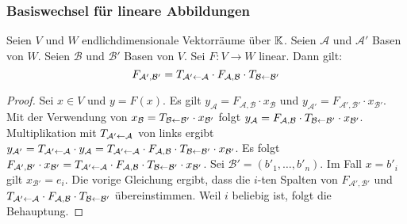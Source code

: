 \subsubsection{Basiswechsel für lineare Abbildungen}

\begin{thm}
	Seien $ V $ und $ W $ endlichdimensionale Vektorräume über $ \mathbb K $. Seien $ \mathcal{A} $ und $ \mathcal{A'} $ Basen von $ W $. Seien $ \mathcal{B} $ und $ \mathcal{B'} $ Basen von $ V $. Sei $ F : V \to W $ linear. Dann gilt:
	\begin{equation}
		F_\mathcal{A',B'} = T_{\mathcal{A'} \leftarrow \mathcal{A}} \cdot F_\mathcal{A,B} \cdot T_{\mathcal{B} \leftarrow \mathcal{B'}}
	\end{equation}
\end{thm}
\begin{proof} 
	Sei $ x \in V $ und $ y = F(x) $. Es gilt $ y_\mathcal{A} = F_\mathcal{A,B} \cdot x_\mathcal{B} $ und $ y_\mathcal{A'} = F_\mathcal{A',B'} \cdot x_\mathcal{B'} $. Mit der Verwendung von $ x_\mathcal{B} = T_{\mathcal{B} \leftarrow \mathcal{B'}} \cdot x_\mathcal{B'} $ folgt $ y_\mathcal{A} = F_\mathcal{A,B} \cdot T_{\mathcal{B} \leftarrow \mathcal{B'}} \cdot x_\mathcal{B'} $. Multiplikation mit $ T_{\mathcal{A'} \leftarrow \mathcal{A}} $ von links ergibt $ y_\mathcal{A'} =  T_{\mathcal{A'} \leftarrow \mathcal{A}} \cdot y_\mathcal{A} = T_{\mathcal{A'} \leftarrow \mathcal{A}} \cdot F_\mathcal{A,B} \cdot T_{\mathcal{B} \leftarrow \mathcal{B'}} \cdot x_\mathcal{B'} $. Es folgt $ F_\mathcal{A',B'} \cdot x_\mathcal{B'} = T_{\mathcal{A'} \leftarrow \mathcal{A}} \cdot F_\mathcal{A,B} \cdot T_{\mathcal{B} \leftarrow \mathcal{B'}} \cdot x_\mathcal{B'} $. Sei $ \mathcal{B'} = (b'_1, \ldots, b'_n) $. Im Fall $ x = b'_i $ gilt $ x_\mathcal{B'} = e_i $. Die vorige Gleichung ergibt, dass die $ i $-ten Spalten von $ F_\mathcal{A',B'} $ und $ T_{\mathcal{A'} \leftarrow \mathcal{A}} \cdot F_\mathcal{A,B} \cdot T_{\mathcal{B} \leftarrow \mathcal{B'}} $ übereinstimmen. Weil $ i $ beliebig ist, folgt die Behauptung.
\end{proof}
